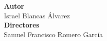 \begin{titlepage}
\vspace{2.5cm}
\noindent\hspace*{\centeroffset}\begin{minipage}{\textwidth}
\centering

\textbf{Autor}\\ {Israel Blancas Álvarez}\\[2.5ex]
\textbf{Directores}\\
{Samuel Francisco Romero García\\
}\\[2cm]
\end{minipage}


\end{titlepage}
